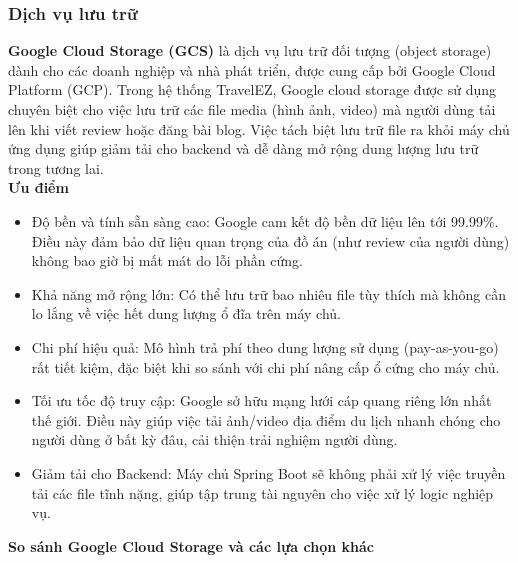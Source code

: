 \subsubsection{Dịch vụ lưu trữ}
\textbf{Google Cloud Storage (GCS)} là dịch vụ lưu trữ đối tượng (object storage) dành cho các doanh nghiệp và nhà phát triển, được cung cấp bởi Google Cloud Platform (GCP). Trong hệ thống TravelEZ, Google cloud storage được sử dụng chuyên biệt cho việc lưu trữ các file media (hình ảnh, video) mà người dùng tải lên khi viết review hoặc đăng bài blog. Việc tách biệt lưu trữ file ra khỏi máy chủ ứng dụng giúp giảm tải cho backend và dễ dàng mở rộng dung lượng lưu trữ trong tương lai.\\
\textbf{Ưu điểm}
\begin{itemize}
    \item Độ bền và tính sẵn sàng cao: Google cam kết độ bền dữ liệu lên tới 99.99\%. Điều này đảm bảo dữ liệu quan trọng của đồ án (như review của người dùng) không bao giờ bị mất mát do lỗi phần cứng.
    \item Khả năng mở rộng lớn: Có thể lưu trữ bao nhiêu file tùy thích mà không cần lo lắng về việc hết dung lượng ổ đĩa trên máy chủ.
    \item Chi phí hiệu quả: Mô hình trả phí theo dung lượng sử dụng (pay-as-you-go) rất tiết kiệm, đặc biệt khi so sánh với chi phí nâng cấp ổ cứng cho máy chủ.
    \item Tối ưu tốc độ truy cập: Google sở hữu mạng lưới cáp quang riêng lớn nhất thế giới. Điều này giúp việc tải ảnh/video địa điểm du lịch nhanh chóng cho người dùng ở bất kỳ đâu, cải thiện trải nghiệm người dùng.
    \item Giảm tải cho Backend: Máy chủ Spring Boot sẽ không phải xử lý việc truyền tải các file tĩnh nặng, giúp tập trung tài nguyên cho việc xử lý logic nghiệp vụ.
\end{itemize}
\textbf{So sánh Google Cloud Storage và các lựa chọn khác}
\clearpage
